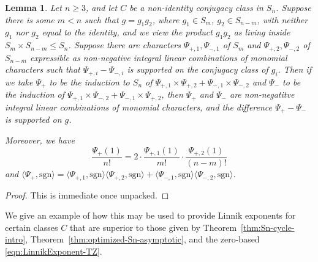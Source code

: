 \documentclass[12pt]{amsart}
\newtheorem{lemma}[theorem]{Lemma}
\theoremstyle{definition} \newtheorem{definition}[theorem]{Definition}
\theoremstyle{example} \newtheorem{example}[theorem]{Example}
\theoremstyle{remark} \newtheorem{remark}{Remark}[theorem]
\numberwithin{equation}{section}
\numberwithin{theorem}{section}
\renewcommand{\leq}{\leqslant}
\renewcommand{\geq}{\geqslant}
\newcommand{\sgn}{\mathrm{sgn}}
\begin{document}
	\begin{lemma}\label{lem:product-of-characters}
		Let $n \geq 3$, and let $C$ be a non-identity conjugacy class in $S_n$.  Suppose there is some $m < n$ such that $g = g_1 g_2$, where $g_1 \in S_m$, $g_2 \in S_{n-m}$, with neither $g_1$ nor $g_2$ equal to the identity, and we view the product $g_1g_2$ as living inside $S_m \times S_{n-m} \leq S_n$.  Suppose there are characters $\Psi_{+,1}, \Psi_{-,1}$ of $S_m$ and $\Psi_{+,2}, \Psi_{-,2}$ of $S_{n-m}$ expressible as non-negative integral linear combinations of monomial characters such that $\Psi_{+,i}-\Psi_{-,i}$ is supported on the conjugacy class of $g_i$.  Then if we take $\Psi_{+}$ to be the induction to $S_n$ of $\Psi_{+,1} \times \Psi_{+,2} + \Psi_{-,1} \times \Psi_{-,2}$ and $\Psi_-$ to be the induction of $\Psi_{+,1} \times \Psi_{-,2} + \Psi_{-,1} \times \Psi_{+,2}$, then $\Psi_+$ and $\Psi_-$ are non-negatitve integral linear combinations of monomial characters, and the difference $\Psi_+ - \Psi_-$ is supported on $g$.
		
		Moreover, we have
			\[
				\frac{\Psi_+(1)}{n!} = 2 \cdot \frac{\Psi_{+,1}(1)}{m!} \cdot \frac{\Psi_{+,2}(1)}{(n-m)!}
			\]
		and $\langle \Psi_+,\sgn\rangle = \langle \Psi_{+,1},\sgn\rangle \langle \Psi_{+,2},\sgn\rangle + \langle \Psi_{-,1},\sgn\rangle \langle \Psi_{-,2},\sgn\rangle$.
	\end{lemma}
	\begin{proof}
		This is immediate once unpacked.
	\end{proof}
	
	We give an example of how this may be used to provide Linnik exponents for certain classes $C$ that are superior to those given by Theorem~\ref{thm:Sn-cycle-intro}, Theorem~\ref{thm:optimized-Sn-asymptotic}, and the zero-based \eqref{eqn:LinnikExponent-TZ}.
	
\end{document}
